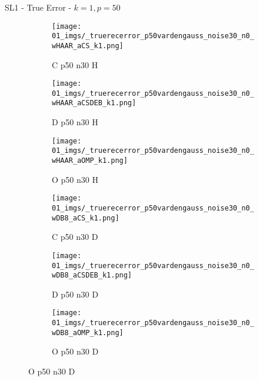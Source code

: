 \begin{frame}{SL1 - True Error - $k=1,p=50$}{}
\begin{figure}
\vspace{5pt}

\begin{subfigure}{0.13\textwidth}
\texttt{[image: 01\_imgs/\_truerecerror\_p50vardengauss\_noise30\_n0\_wHAAR\_aCS\_k1.png]}
\caption*{\tiny C p50 n30 H}
\end{subfigure}
\begin{subfigure}{0.13\textwidth}
\texttt{[image: 01\_imgs/\_truerecerror\_p50vardengauss\_noise30\_n0\_wHAAR\_aCSDEB\_k1.png]}
\caption*{\tiny D p50 n30 H}
\end{subfigure}
\begin{subfigure}{0.13\textwidth}
\texttt{[image: 01\_imgs/\_truerecerror\_p50vardengauss\_noise30\_n0\_wHAAR\_aOMP\_k1.png]}
\caption*{\tiny O p50 n30 H}
\end{subfigure}
\begin{subfigure}{0.13\textwidth}
\texttt{[image: 01\_imgs/\_truerecerror\_p50vardengauss\_noise30\_n0\_wDB8\_aCS\_k1.png]}
\caption*{\tiny C p50 n30 D}
\end{subfigure}
\begin{subfigure}{0.13\textwidth}
\texttt{[image: 01\_imgs/\_truerecerror\_p50vardengauss\_noise30\_n0\_wDB8\_aCSDEB\_k1.png]}
\caption*{\tiny D p50 n30 D}
\end{subfigure}
\begin{subfigure}{0.13\textwidth}
\texttt{[image: 01\_imgs/\_truerecerror\_p50vardengauss\_noise30\_n0\_wDB8\_aOMP\_k1.png]}
\caption*{\tiny O p50 n30 D}
\end{subfigure}
\end{figure}
\end{frame}


